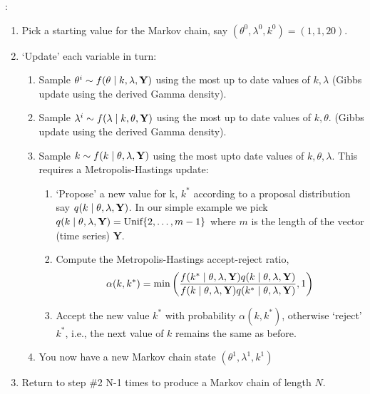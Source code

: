\documentclass[11pt]{article}
\begin{document}
\newpage
{}:
\begin{enumerate}
\item Pick a starting value for the Markov chain, say $(\theta^0,\lambda^0,k^0)=(1,1,20)$.
\item `Update' each variable in turn:
  \begin{enumerate}
  \item Sample $\theta^i \sim f(\theta\mid k,\lambda,{\bf Y})$
    using the most up to date values of $k,\lambda$ (Gibbs
    update using the derived Gamma density).
  \item Sample $\lambda^i \sim f(\lambda\mid k,\theta,{\bf Y})$
    using the most up to date values of $k,\theta$. (Gibbs
    update using the derived Gamma density).
  \item Sample $k \sim f(k \mid \theta,\lambda,{\bf Y})$ using
    the most upto date values of $k,\theta,\lambda$. This
    requires a Metropolis-Hastings update:
    \begin{enumerate}
    \item `Propose' a new value for k, $k^*$ according to a proposal
      distribution say $q(k \mid \theta,\lambda,{\bf Y})$. In
      our simple example we pick  $q(k\mid\theta,\lambda,{\bf Y})
       = \mbox{Unif}\{2,\dots,m-1\}$ where $m$ is the length of the
     vector (time series) {\bf Y}.
   \item Compute the Metropolis-Hastings accept-reject ratio,
     $$\alpha(k,k^*)=\min\left(\frac{f(k^* \mid \theta,\lambda,{\bf Y}) q(k \mid \theta,\lambda,{\bf Y})}{f(k \mid
         \theta,\lambda,{\bf Y}) q(k^* \mid \theta,\lambda,{\bf Y})},1 \right)$$
   \item Accept the new value $k^*$ with probability $\alpha(k,k^*)$,
     otherwise `reject' $k^*$, i.e., the next value of $k$ remains the
     same as before.
\end{enumerate}
\item You now have a new Markov chain state $(\theta^1,\lambda^1,k^1)$
  \end{enumerate}
\item Return to step \#2 N-1 times to produce a Markov chain of length $N$.
\end{enumerate}
\end{document}
